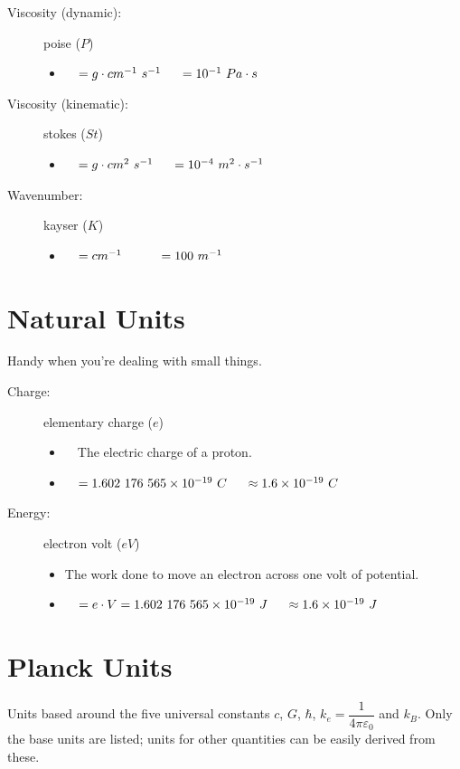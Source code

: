 \documentclass[]{report}
\newcommand \tab[1][1cm]{\hspace*{#1}}
\newcommand{\items}{\item\ \ }
\begin{document}
\begin{description}
\item[Viscosity (dynamic):] poise ($P$)
\begin{itemize}
\items $=g\cdot cm^{-1}\ s^{-1} \tab[0.5cm]=10^{-1}\ Pa\cdot s$
\end{itemize}

\item[Viscosity (kinematic):] stokes ($St$)
\begin{itemize}
\items $=g\cdot cm^{2}\ s^{-1} \tab[0.5cm]=10^{-4}\ m^2 \cdot s^{-1}$
\end{itemize}

\item[Wavenumber:] kayser ($K$)
\begin{itemize}
\items $=cm^{-1} \tab[0.5cm]\tab[0.5cm]=100\ m^{-1}$
\end{itemize}				
\end{description}
			

\section{Natural Units}	
Handy when you're dealing with small things.

\begin{description}				

\item[Charge:] elementary charge ($e$)
\begin{itemize}
\items The electric charge of a proton.
\items $= 1.602\ 176\ 565 \times 10^{-19}\ C \tab[0.5cm]\approx 1.6 \times 10^{-19}\ C$
\end{itemize}

\item[Energy:] electron volt ($eV$)
\begin{itemize}
\item The work done to move an electron across one volt of potential.
\items $= e\cdot V = 1.602\ 176\ 565 \times 10^{-19}\ J \tab[0.5cm]\approx 1.6 \times 10^{-19}\ J$
\end{itemize}					
\end{description}	
            

\section{Planck Units}
Units based around the five universal constants $c$, $G$, $\hbar$, $k_e = \dfrac{1}{4\pi\varepsilon_0}$ and $k_B$. Only the base units are listed; units for other quantities can be easily derived from these.
\end{document}
